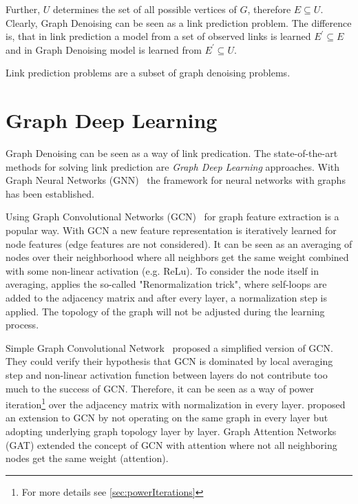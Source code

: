 Further, $U$ determines the set of all possible vertices of $G$, therefore $E \subseteq U$.
Clearly, Graph Denoising can be seen as a link prediction problem.
The difference is, that in link prediction a model from a set of observed links is learned
$E^{\prime} \subseteq E$ and in Graph Denoising model is learned from 
$E^{\prime} \subseteq U$. 

\begin{tcolorbox}[colback=red!5!white,colframe=red!75!black]
    Link prediction problems are a subset of graph denoising problems.
\end{tcolorbox}

\section{Graph Deep Learning}
\label{sec:graph_depp_learning}
Graph Denoising can be seen as a way of link predication. 
The state-of-the-art methods for solving link prediction are \textit{Graph Deep Learning} approaches.
With Graph Neural Networks (GNN)~\cite{GNN} the framework
for neural networks with graphs has been established. 

Using Graph Convolutional Networks (GCN)~\cite{GCN} for graph feature extraction is a popular way. 
With GCN a new feature representation is iteratively learned for node features (edge features are not considered).
It can be seen as an averaging of nodes over their neighborhood where all neighbors get the same weight combined with some non-linear activation (e.g. ReLu). 
To consider the node itself in averaging, \citet{GCN} applies the so-called "Renormalization trick", where self-loops are added to the 
adjacency matrix and after every layer, a normalization step is applied. 
The topology of the graph will not be adjusted during the learning process.

Simple Graph Convolutional Network~\cite{simpleGCN} proposed a simplified version of GCN.
They could verify their hypothesis that GCN is dominated by local averaging step and non-linear 
activation function between layers do not contribute too much to the success of GCN. 
Therefore, it can be seen as a way of power iteration\footnote{For more details see \ref{sec:powerIterations}}
over the adjacency matrix with normalization in every layer.
\citet{dynamicGCN} proposed an extension to GCN by not operating on the same graph in every layer but adopting
underlying graph topology layer by layer.
Graph Attention Networks (GAT) \cite{GAT} extended the concept of GCN with attention where not
all neighboring nodes get the same weight (attention).
